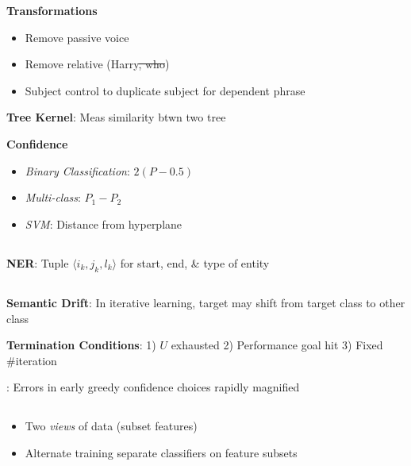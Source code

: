 \documentclass[9pt]{extarticle}
\renewcommand{\green}[1]{{\color{ForestGreen} #1}}
\newcommand{\greenbf}[1]{\textbf{\green{#1}}}
\newcommand{\redbf}[1]{\textbf{\red{#1}}}
\begin{document}
\begin{multicols}{3}
  \textbf{Transformations}
  \begin{itemize}
    \item Remove passive voice
    \item Remove relative (Harry\st{, who})
    \item Subject control to duplicate subject for dependent phrase
  \end{itemize}

  \greenbf{Tree Kernel}: Meas similarity btwn two tree

  \greenbf{Confidence}
  \begin{itemize}
    \item \textit{Binary Classification}: $2(P-0.5)$
    \item \textit{Multi-class}: $P_1 - P_2$
    \item \textit{SVM}: Distance from hyperplane
  \end{itemize}

  \subsection*{}

  \greenbf{NER}: Tuple ${\langle i_k, j_k, l_k \rangle}$ for start, end, \& type of entity

  \subsection*{}

  \greenbf{Semantic Drift}: In iterative learning, target may shift from target class to other class

  \textbf{Termination Conditions}: 1) $U$ exhausted 2) Performance goal hit 3) Fixed \#iteration

  \redbf{Problem}: Errors in early greedy confidence choices rapidly magnified

  \subsection*{}
  \begin{itemize}
    \item Two \textit{views} of data (subset features)
    \item Alternate training separate classifiers on feature subsets
  \end{itemize}

\end{multicols}
\end{document}
